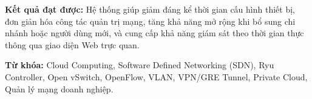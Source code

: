 \textbf{Kết quả đạt được:} Hệ thống giúp giảm đáng kể thời gian cấu hình thiết bị, đơn giản hóa công tác quản trị mạng, tăng khả năng mở rộng khi bổ sung chi nhánh hoặc người dùng mới, và cung cấp khả năng giám sát theo thời gian thực thông qua giao diện Web trực quan.

\textbf{Từ khóa:} Cloud Computing, Software Defined Networking (SDN), Ryu Controller, Open vSwitch, OpenFlow, VLAN, VPN/GRE Tunnel, Private Cloud, Quản lý mạng doanh nghiệp.

\newpage
